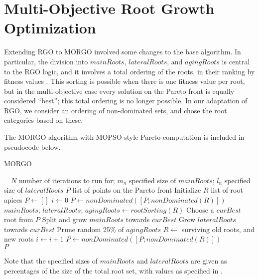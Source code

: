 \documentclass[letterpaper, 10 pt, conference]{ieeeconf}  %
\begin{document}
\section{Multi-Objective Root Growth Optimization}

Extending RGO to MORGO involved some changes to the base algorithm.  In particular, the division into $mainRoots$, $lateralRoots$, and $agingRoots$ is central to the RGO logic, and it involves a total ordering of the roots, in their ranking by fitness values \cite{RGOPaper}.  This sorting is possible when there is one fitness value per root, but in the multi-objective case every solution on the Pareto front is equally considered ``best''; this total ordering is no longer possible.  In our adaptation of RGO, we consider an ordering of non-dominated sets, and chose the root categories based on these.  

The MORGO algorithm with MOPSO-style Pareto computation is included in pseudocode below.  

\begin{algorithm}[H]
\caption{MORGO}
\begin{algorithmic}[1]
\Input $\quad N$ number of iterations to run for; $m_n$ specified size of $mainRoots$; $l_n$ specified size of $lateralRoots$
\Output $P$ list of points on the Pareto front
\State Initialize $R$ list of root apices 
\State ${P \gets []}$
\State $i \gets 0$
	\State ${P \gets nonDominated( [P; nonDominated( R)])}$
	\State $mainRoots$; $lateralRoots$; $agingRoots \gets rootSorting( R)$
	\State Choose a $curBest$ root from $P$
	\State Split and grow $mainRoots$ towards $curBest$
	\State Grow $lateralRoots$ towards $curBest$
	\State Prune random 25\% of $agingRoots$
	\State $R \gets$ surviving old roots, and new roots
	\State ${i \gets i + 1}$
\EndWhile
\State ${P \gets nonDominated( [P; nonDominated( R)])}$\\
\Return $P$
\EndProcedure
\end{algorithmic}
\end{algorithm}

Note that the specified sizes of $mainRoots$ and $lateralRoots$ are given as percentages of the size of the total root set, with values as specified in \cite{RGOPaper}.
\end{document}

